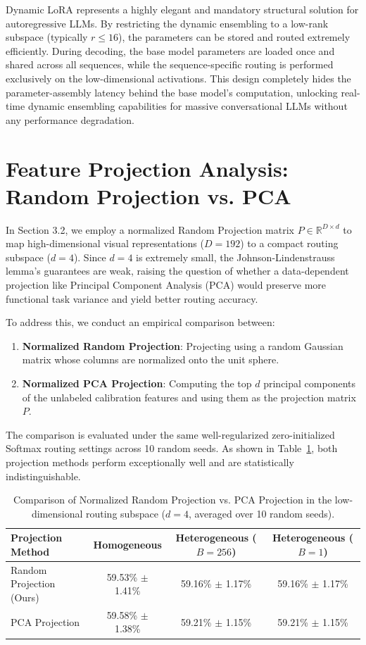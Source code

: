 \documentclass{article}
\theoremstyle{plain}
\theoremstyle{definition}
\theoremstyle{remark}
\begin{document}
Dynamic LoRA represents a highly elegant and mandatory structural solution for autoregressive LLMs. By restricting the dynamic ensembling to a low-rank subspace (typically $r \le 16$), the parameters can be stored and routed extremely efficiently. During decoding, the base model parameters are loaded once and shared across all sequences, while the sequence-specific routing is performed exclusively on the low-dimensional activations. This design completely hides the parameter-assembly latency behind the base model's computation, unlocking real-time dynamic ensembling capabilities for massive conversational LLMs without any performance degradation.

\section{Feature Projection Analysis: Random Projection vs. PCA}
\label{app:pca}
In Section 3.2, we employ a normalized Random Projection matrix $P \in \mathbb{R}^{D \times d}$ to map high-dimensional visual representations ($D=192$) to a compact routing subspace ($d=4$). Since $d=4$ is extremely small, the Johnson-Lindenstrauss lemma's guarantees are weak, raising the question of whether a data-dependent projection like Principal Component Analysis (PCA) would preserve more functional task variance and yield better routing accuracy.

To address this, we conduct an empirical comparison between:
\begin{enumerate}
    \item \textbf{Normalized Random Projection}: Projecting using a random Gaussian matrix whose columns are normalized onto the unit sphere.
    \item \textbf{Normalized PCA Projection}: Computing the top $d$ principal components of the unlabeled calibration features and using them as the projection matrix $P$.
\end{enumerate}

The comparison is evaluated under the same well-regularized zero-initialized Softmax routing settings across 10 random seeds. As shown in Table~\ref{tab:pca_comparison}, both projection methods perform exceptionally well and are statistically indistinguishable.

\begin{table}[ht]
\caption{Comparison of Normalized Random Projection vs. PCA Projection in the low-dimensional routing subspace ($d=4$, averaged over 10 random seeds).}
\label{tab:pca_comparison}
\begin{center}
\setlength{\tabcolsep}{8pt}
\begin{tabular}{lccc}
\toprule
\textbf{Projection Method} & \textbf{Homogeneous} & \textbf{Heterogeneous ($B=256$)} & \textbf{Heterogeneous ($B=1$)} \\
\midrule
Random Projection (Ours) & 59.53\% $\pm$ 1.41\% & 59.16\% $\pm$ 1.17\% & 59.16\% $\pm$ 1.17\% \\
PCA Projection           & 59.58\% $\pm$ 1.38\% & 59.21\% $\pm$ 1.15\% & 59.21\% $\pm$ 1.15\% \\
\bottomrule
\end{tabular}
\end{center}
\end{table}
\end{document}
